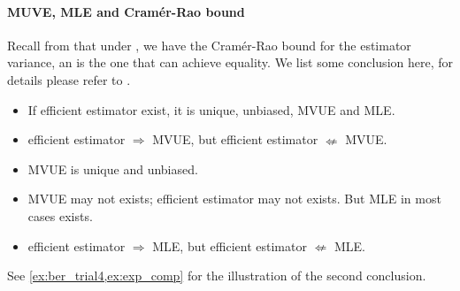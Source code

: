 \documentclass{article}
\begin{document}
\paragraph{MUVE, MLE and Cram\'er-Rao bound}
Recall from \cite[Chapter 3.]{mitnotes} that under , we have the Cram\'er-Rao bound for the estimator variance, an  is the one that can achieve equality. We list some conclusion here, for details please refer to  \cite[Chapter 3.]{mitnotes}.
\begin{itemize}
    \item If efficient estimator exist, it is unique, unbiased, MVUE and MLE.
        \item efficient estimator $\Rightarrow$ MVUE, but efficient estimator $\nLeftarrow$ MVUE.
    \item MVUE is unique and unbiased.
    \item MVUE may not exists; efficient estimator may not exists. But MLE in most cases exists.
    \item  efficient estimator $\Rightarrow$ MLE, but efficient estimator $\nLeftarrow$ MLE.
\end{itemize}
\begin{rema}
See \cref{ex:ber_trial4,ex:exp_comp} for the illustration of the second conclusion.
\end{rema}
\end{document}
